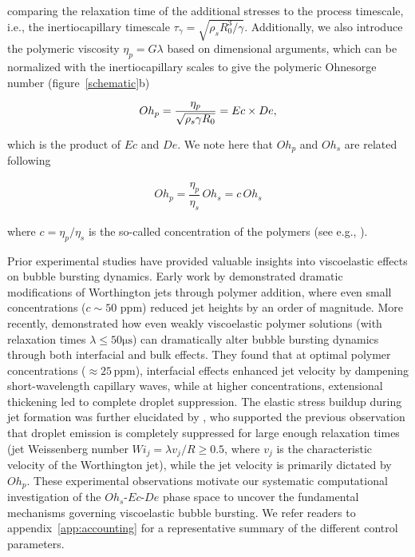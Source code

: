 \documentclass{jfm}
\newcommand{\DL}[1]{{\textcolor{black}{#1}}}
\newcommand{\oo}{\color{magenta} \normalfont}
\newcommand{\bb}{\color{black} \normalfont}
\begin{document}
\noindent comparing the relaxation time of the additional stresses to the process timescale, i.e., the inertiocapillary timescale $\tau_{\gamma} = \sqrt{\rho_sR_0^3/\gamma}$. Additionally, we also introduce the polymeric viscosity $\eta_p = G\lambda$ based on dimensional arguments, which can be normalized with the inertiocapillary scales to give the polymeric Ohnesorge number (figure~\ref{schematic}b)

\begin{align}
	\label{eq:Ohpdef}
	Oh_p = \frac{\eta_p}{\sqrt{\rho_s\gamma R_0}} = \DL{Ec \times De},
\end{align}

\noindent which is the product of $Ec$ and $De$. \oo We note here that $Oh_p$ and $Oh_s$ are related following

\begin{align}
	Oh_p = \dfrac{\eta_p}{\eta_s} \, Oh_s = c\,Oh_s
\end{align}

\noindent where $c = \eta_p/\eta_s$ is the so-called concentration of the polymers (see e.g., \citet{remmelgas1999computational, hinch2024fast}). \bb

\oo Prior experimental studies have provided valuable insights into viscoelastic effects on bubble bursting dynamics. Early work by \citet{cheny1996extravagant} demonstrated dramatic modifications of Worthington jets through polymer addition, where even small concentrations ($c \sim 50$ ppm) reduced jet heights by an order of magnitude.
More recently, \citet{rodriguez2023bubble} demonstrated how even weakly viscoelastic polymer solutions (with relaxation times $\lambda \leq 50\si{\micro\second}$) can dramatically alter bubble bursting dynamics through both interfacial and bulk effects. They found that at optimal polymer concentrations ($\approx 25\,\text{ppm}$), interfacial effects enhanced jet velocity by dampening short-wavelength capillary waves, while at higher concentrations, extensional thickening led to complete droplet suppression.
The elastic stress buildup during jet formation was further elucidated by \citet{cabalganteeffect}, who supported the previous observation that droplet emission is completely suppressed for large enough relaxation times (jet Weissenberg number $Wi_j = \lambda v_j/R \ge 0.5$, where $v_j$ is the characteristic velocity of the Worthington jet), while the jet velocity is primarily dictated by $Oh_p$. These experimental observations motivate our systematic computational investigation of the $Oh_s$-$Ec$-$De$ phase space to uncover the fundamental mechanisms governing viscoelastic bubble bursting. We refer readers to appendix~\ref{app:accounting} for a representative summary of the different control parameters.\bb
\end{document}
